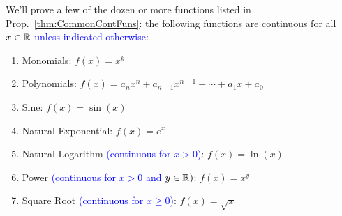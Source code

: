 \begin{tcolorbox}[title=\textcolor{black}{Proof of Prop.~\ref{thm:CommonContFuns} (Common Continuous Functions}, sharp corners, colback=green!30, colframe=green!80!blue, breakable, fonttitle=\bfseries]

We'll prove a few of the dozen or more functions listed in Prop.~\ref{thm:CommonContFuns}: the following functions are continuous for all $x\in \mathbb R$ \textcolor{blue}{unless indicated otherwise}:

\begin{enumerate}
\renewcommand{\labelenumi}{(\alph{enumi})}
\setlength{\itemsep}{.2cm}
\item Monomials: $f(x) = x^k$

  \item Polynomials: $ f(x) = a_nx^n + a_{n-1}x^{n-1} + \cdots + a_1x + a_0 $
\item  Sine: $ f(x) = \sin(x) $


\item Natural Exponential: $ f(x) = e^x $

\item Natural Logarithm \textcolor{blue}{(continuous for $ x > 0 $)}: $ f(x) = \ln(x) $
  
\item Power \textcolor{blue}{(continuous for $x > 0$ and $y \in \mathbb R)$}: $ f(x) = x^y $



  \item Square Root \textcolor{blue}{(continuous for $ x \geq 0 $)}: $ f(x) = \sqrt{x} $

\end{enumerate}

\end{tcolorbox}



\bigskip


